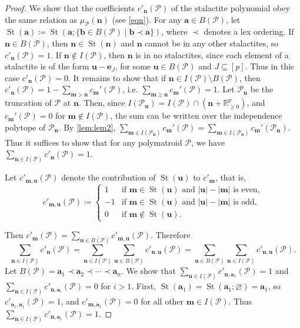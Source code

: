\documentclass[10pt,a4paper]{amsart}
\DeclareMathOperator{\St}{St}
\newcommand{\R}{\mathbb{R}}
\newcommand{\bfa}{\mathbf{a}}
\newcommand{\bfb}{\mathbf{b}}
\newcommand{\bfe}{\mathbf{e}}
\newcommand{\bfm}{\mathbf{m}}
\newcommand{\bfn}{\mathbf{n}}
\newcommand{\bfu}{\mathbf{u}}
\newcommand{\sP}{\mathscr{P}}
\begin{document}
\begin{proof}
We show that the coefficients $c'_\bfn(\sP)$ of the stalactite polynomial obey the same relation as $\mu_\sP(\bfn)$ (see \autoref{eqn}). For any $\bfa \in B(\sP)$, let $\St(\bfa) \coloneqq \St(\bfa; \{\bfb \in B(\sP) \mid \bfb \prec \bfa\})$, where $\prec$ denotes a lex ordering. If $\bfn \in B(\sP)$, then $\bfn \in \St(\bfn)$ and $\bfn$ cannot be in any other stalactites, so $c'_\bfn(\sP) = 1$. If $\bfn \notin I(\sP)$, then $\bfn$ is in no stalactites, since each element of a stalactite is of the form $\bfu-\bfe_J$, for some $\bfu \in B(\sP)$ and $J \subseteq [p]$. Thus in this case $c'_\bfn(\sP) = 0$. It remains to show that if $\bfn \in I(\sP) \setminus B(\sP)$, then $c'_\bfn(\sP) = 1-\sum_{\bfm>\bfn}c_\bfm'(\sP)$, i.e. $\sum_{\bfm\ge\bfn}c_\bfm'(\sP) = 1$. Let $\sP_{\bfn}$ be the truncation of $\sP$ at $\bfn$. Then, since $I(\sP_\bfn) = I(\sP) \cap (\bfn + \R_{\ge 0}^p)$, and $c_{\bfm}'(\sP) = 0$ for $\bfm \notin I(\sP)$, the sum can be written over the independence polytope of $\sP_\bfn$. By \autoref{lem:lem2}, $\sum_{\bfm \in I(\sP_\bfn)}c_\bfm'(\sP) = \sum_{\bfm \in I(\sP_{\bfn})}c_\bfm'(\sP_{\bfn})$. Thus it suffices to show that for any polymatroid $\sP$, we have $\sum_{\bfn \in I(\sP)} c'_\bfn(\sP) = 1$. 

Let $c'_{\bfm, \bfu}(\sP)$ denote the contribution of $\St(\bfu)$ to $c'_\bfm$, that is, $$c'_{\bfm, \bfu}(\sP) \coloneqq \begin{cases}
    1 &\text{if } \bfm \in \St(\bfu) \text{ and } |\bfu| - |\bfm| \text{ is even,}\\
    -1 &\text{if } \bfm \in \St(\bfu) \text{ and } |\bfu| - |\bfm| \text{ is odd,}\\
    0 &\text{if } \bfm \notin \St(\bfu). 
\end{cases}$$

Then $c'_\bfm(\sP) = \sum_{\bfu \in B(\sP)} c'_{\bfm, \bfu}(\sP)$. Therefore 
\[\sum_{\bfn \in I(\sP)} c'_\bfn(\sP) = \sum_{\bfn \in I(\sP)}\sum_{\bfu \in B(\sP)} c'_{\bfn, \bfu}(\sP) = \sum_{\bfu \in B(\sP)}\sum_{\bfn \in I(\sP)} c'_{\bfn, \bfu}(\sP).\]
Let $B(\sP) = \bfa_1 \prec \bfa_2 \prec \cdots \prec \bfa_n$. We show that $\sum_{\bfn \in I(\sP)} c'_{\bfn, \bfa_1}(\sP) = 1$ and $\sum_{\bfn \in I(\sP)} c'_{\bfn, \bfa_i}(\sP) = 0$ for $i > 1$.
First, $\St(\bfa_1) = \St(\bfa_1; \varnothing) = \bfa_1$, so $c'_{\bfa_1,\bfa_1}(\sP) = 1$, and $c'_{\bfm, \bfa_1}(\sP) = 0$ for all other $\bfm \in I(\sP)$. Thus $\sum_{\bfn \in I(\sP)} c'_{\bfn, \bfa_1}(\sP) = 1$. 


\end{proof}
\end{document}
